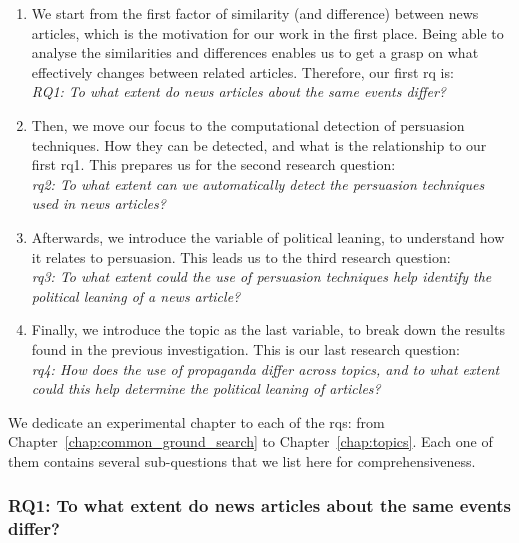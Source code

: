 \begin{enumerate}
    \item We start from the first factor of similarity (and difference) between news articles, which is the motivation for our work in the first place. Being able to analyse the similarities and differences enables us to get a grasp on what effectively changes between related articles. Therefore, our first \acrfull{rq} is:\\
          \emph{RQ1: To what extent do news articles about the same events differ?}
    \item Then, we move our focus to the computational detection of persuasion techniques. How they can be detected, and what is the relationship to our first \acrshort{rq}1. This prepares us for the second research question: \\
          \emph{\acrshort{rq}2: To what extent can we automatically detect the persuasion techniques used in news articles?}
    \item Afterwards, we introduce the variable of political leaning, to understand how it relates to persuasion. This leads us to the third research question:\\
          \emph{\acrshort{rq}3: To what extent could the use of persuasion techniques help identify the political leaning of a news article?}
    \item Finally, we introduce the topic as the last variable, to break down the results found in the previous investigation. This is our last research question:\\
          \emph{\acrshort{rq}4: How does the use of propaganda differ across topics, and to what extent could this help determine the political leaning of articles?}
\end{enumerate}

We dedicate an experimental chapter to each of the \acrlong{rq}s: from Chapter~\ref{chap:common_ground_search} to Chapter~\ref{chap:topics}.
Each one of them contains several sub-questions that we list here for comprehensiveness.


\subsubsection*{RQ1: To what extent do news articles about the same events differ?}

